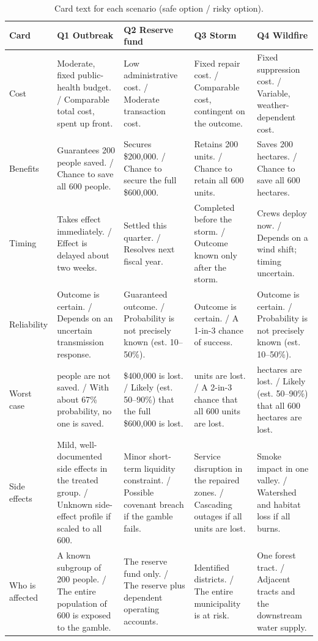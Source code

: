 \documentclass[11pt]{article}
\begin{document}
\begin{table}[ht]
\centering
\footnotesize
\caption{Card text for each scenario (safe option / risky option).}
\label{tab:s1}
\setlength{\tabcolsep}{4pt}
\begin{tabularx}{\linewidth}{l>{\raggedright\arraybackslash}X>{\raggedright\arraybackslash}X>{\raggedright\arraybackslash}X>{\raggedright\arraybackslash}X}
\toprule
Card & Q1 Outbreak & Q2 Reserve fund & Q3 Storm & Q4 Wildfire \\
\midrule
Cost & Moderate, fixed public-health budget. / Comparable total cost, spent up front. & Low administrative cost. / Moderate transaction cost. & Fixed repair cost. / Comparable cost, contingent on the outcome. & Fixed suppression cost. / Variable, weather-dependent cost. \\
Benefits & Guarantees 200 people saved. / Chance to save all 600 people. & Secures \$200,000. / Chance to secure the full \$600,000. & Retains 200 units. / Chance to retain all 600 units. & Saves 200 hectares. / Chance to save all 600 hectares. \\
Timing & Takes effect immediately. / Effect is delayed about two weeks. & Settled this quarter. / Resolves next fiscal year. & Completed before the storm. / Outcome known only after the storm. & Crews deploy now. / Depends on a wind shift; timing uncertain. \\
Reliability & Outcome is certain. / Depends on an uncertain transmission response. & Guaranteed outcome. / Probability is not precisely known (est. 10--50\%). & Outcome is certain. / A 1-in-3 chance of success. & Outcome is certain. / Probability is not precisely known (est. 10--50\%). \\
Worst case & 400 people are not saved. / With about 67\% probability, no one is saved. & \$400,000 is lost. / Likely (est. 50--90\%) that the full \$600,000 is lost. & 400 units are lost. / A 2-in-3 chance that all 600 units are lost. & 400 hectares are lost. / Likely (est. 50--90\%) that all 600 hectares are lost. \\
Side effects & Mild, well-documented side effects in the treated group. / Unknown side-effect profile if scaled to all 600. & Minor short-term liquidity constraint. / Possible covenant breach if the gamble fails. & Service disruption in the repaired zones. / Cascading outages if all units are lost. & Smoke impact in one valley. / Watershed and habitat loss if all burns. \\
Who is affected & A known subgroup of 200 people. / The entire population of 600 is exposed to the gamble. & The reserve fund only. / The reserve plus dependent operating accounts. & Identified districts. / The entire municipality is at risk. & One forest tract. / Adjacent tracts and the downstream water supply. \\
\bottomrule
\end{tabularx}
\end{table}
\end{document}

